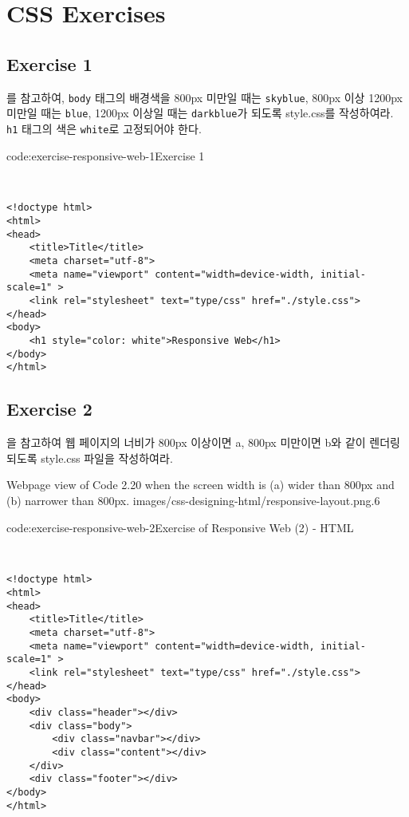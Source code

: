 \section{CSS Exercises} \label{sect:css-exercises}

\subsection*{Exercise 1}
를 참고하여, \texttt{body} 태그의 배경색을 800px 미만일 때는 \texttt{skyblue}, 800px 이상 1200px 미만일 때는 \texttt{blue}, 1200px 이상일 때는 \texttt{darkblue}가 되도록 style.css를 작성하여라. \texttt{h1} 태그의 색은 \texttt{white}로 고정되어야 한다.

\begin{codeenv}{code:exercise-responsive-web-1}{Exercise 1}\begin{verbatim}


<!doctype html>
<html>
<head>
    <title>Title</title>
    <meta charset="utf-8">
    <meta name="viewport" content="width=device-width, initial-scale=1" >
    <link rel="stylesheet" text="type/css" href="./style.css">
</head>
<body>
    <h1 style="color: white">Responsive Web</h1>
</body>
</html>
\end{verbatim}
\end{codeenv}

\subsection*{Exercise 2}
을 참고하여 웹 페이지의 너비가 800px 이상이면 a, 800px 미만이면 b와 같이 렌더링 되도록 style.css 파일을 작성하여라.

    {Webpage view of Code 2.20 when the screen width is (a) wider than 800px and (b) narrower than 800px.}
    {images/css-designing-html/responsive-layout.png}{.6}

\begin{codeenv}{code:exercise-responsive-web-2}{Exercise of Responsive Web (2) - HTML}\begin{verbatim}


<!doctype html>
<html>
<head>
    <title>Title</title>
    <meta charset="utf-8">
    <meta name="viewport" content="width=device-width, initial-scale=1" >
    <link rel="stylesheet" text="type/css" href="./style.css">
</head>
<body>
    <div class="header"></div>
    <div class="body">
        <div class="navbar"></div>
        <div class="content"></div>
    </div>
    <div class="footer"></div>
</body>
</html>
\end{verbatim}
\end{codeenv}
